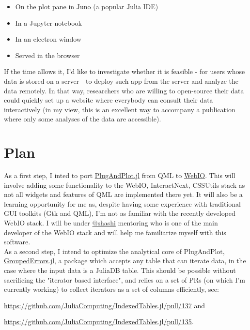 \documentclass[10pt,a4paper]{report}
\begin{document}
\begin{itemize}
    \item On the plot pane in Juno (a popular Julia IDE)
    \item In a Jupyter notebook
    \item In an electron window
    \item Served in the browser
\end{itemize}

If the time allows it, I'd like to investigate whether it is feasible - for users whose data is stored on a server - to deploy such app from the server and analyze the data remotely. In that way, researchers who are willing to open-source their data could quickly set up a website where everybody can consult their data interactively (in my view, this is an excellent way to accompany a publication where only some analyses of the data are accessible).

\section*{Plan}

As a first step, I inted to port \href{https://github.com/piever/PlugAndPlot.jl}{PlugAndPlot.jl} from QML to \href{https://github.com/JuliaGizmos/WebIO.jl}{WebIO}. This will involve adding some functionality to the WebIO, InteractNext, CSSUtils stack as not all widgets and features of QML are implemented there yet. It will also be a learning opportunity for me as, despite having some experience with traditional GUI toolkits (Gtk and QML), I'm not as familiar with the recently developed WebIO stack. I will be under \href{https://github.com/shashi}{@shashi} mentoring who is one of the main developer of the WebIO stack and will help me familiarize myself with this software. \\

As a second step, I intend to optimize the analytical core of PlugAndPlot, \href{https://github.com/piever/GroupedErrors.jl}{GroupedErrors.jl}, a package which accepts any table that can iterate data, in the case where the input data is a JuliaDB table. This should be possible without sacrificing the "iterator based interface", and relies on a set of PRs (on which I'm currently working) to collect iterators as a set of columns efficiently, see:

 \url{https://github.com/JuliaComputing/IndexedTables.jl/pull/137} and

  \url{https://github.com/JuliaComputing/IndexedTables.jl/pull/135}.\\
\end{document}

